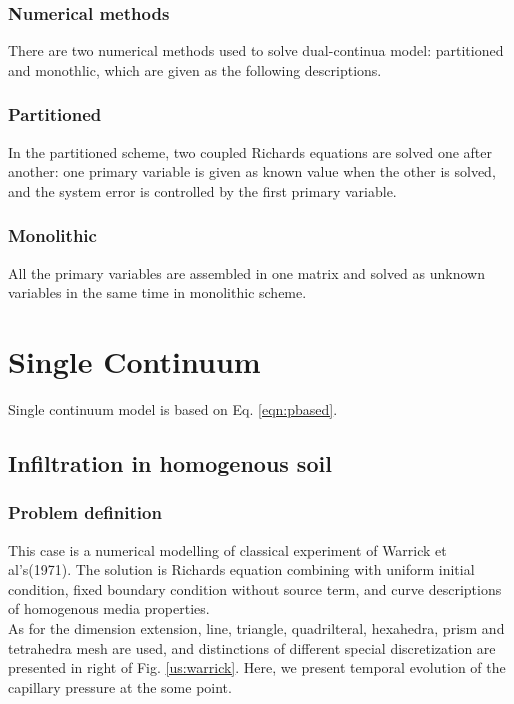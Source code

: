 \subsubsection{Numerical methods}
There are two numerical methods used to solve dual-continua model:
partitioned and monothlic, which are given as the following
descriptions.
\subsubsection*{Partitioned}
In the partitioned scheme, two coupled Richards equations are
solved one after another: one primary variable is given as known
value when the other is solved, and the system error is controlled
by the first primary variable.
\subsubsection*{Monolithic}
All the primary variables are assembled in one matrix and solved
as unknown variables in the same time in monolithic scheme.


\section{Single Continuum}
%
Single continuum model is based on Eq. \ref{eqn:pbased}.
%
\subsection{Infiltration in homogenous soil}
\label{sec:Warrick}
\subsubsection*{Problem definition}
This case is a numerical modelling of classical experiment of
Warrick et al's(1971)\cite{Warrick:1971}. The solution is Richards
equation combining with uniform initial condition, fixed boundary
condition without source term, and curve descriptions of
homogenous media properties.\\
As for the dimension extension, line, triangle, quadrilteral, hexahedra, prism and tetrahedra mesh are used, and distinctions of different special discretization are presented in right of Fig. \ref{us:warrick}. Here, we present temporal evolution of the capillary pressure at the some point.
%
